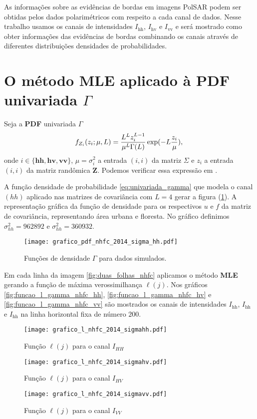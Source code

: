 As informações sobre as evidências de bordas em imagens PolSAR podem ser obtidas pelos dados polarimétricos com respeito a cada canal de dados. Nesse trabalho usamos os canais de intensidades $I_{\text{hh}}$, $I_{\text{hv}}$ e $I_{\text{vv}}$ e será mostrado como obter informações das evidências de bordas combinando os canais através de diferentes distribuições densidades de probabilidades.   


\section{O método \textbf{MLE} aplicado à \textbf{PDF} univariada $\Gamma$}

Seja a \textbf{PDF} univariada $\Gamma$  
\begin{equation}\label{eq:univariada_gamma}
	f_{Z_{i}}(z_{i};\mu,L)=\frac{L^{L}z_{i}^{L-1}}{\mu^L\Gamma(L)} \exp(-L\frac{z_i}{\mu}), \\
\end{equation}
onde $i\in \{\textbf{hh}, \textbf{hv}, \textbf{vv}\}$, $\mu=\sigma_{i}^2$ a entrada $(i,i)$ da matriz $\Sigma$ e $z_{i}$ a entrada $(i,i)$ da matriz randômica $\mathbf{Z}$. Podemos verificar essa expressão em \citep{fnc, nhfc, hsbmp}.	 

A função densidade de probabilidade \eqref{eq:univariada_gamma} que modela o canal $(hh)$ aplicado nas matrizes de covariância com $L=4$ gerar a figura (\ref{fig:densidades_para_u_f_nhfc}). A representação gráfica da função de densidade para os respectivos $u$ e $f$ da matriz de covariância, representando área urbana e floresta. No gráfico definimos $\sigma^2_{hh}=962892$ e $\sigma^2_{hh}= 360932$. 

\begin{figure}[hbt]
	\centering
  \texttt{[image: grafico\_pdf\_nhfc\_2014\_sigma\_hh.pdf]}
	\caption{Funções de densidade $\Gamma$ para dados simulados.}\label{fig:densidades_para_u_f_nhfc}
\end{figure}

	Em cada linha da imagem \eqref{fig:duas_folhas_nhfc} aplicamos o método \textbf{MLE} gerando a função de máxima verossimilhança $\ell(j)$. Nos gráficos \eqref{fig:funcao_l_gamma_nhfc_hh}, \eqref{fig:funcao_l_gamma_nhfc_hv} e \eqref{fig:funcao_l_gamma_nhfc_vv} são mostrados os canais de intensidades $I_{\text{hh}}$, $I_{\text{hh}}$ e $I_{\text{hh}}$ na linha horizontal fixa de número $200$. 
\begin{figure}[hbt]\label{fig:funcao_l_gamma_nhfc}
  \texttt{[image: grafico\_l\_nhfc\_2014\_sigmahh.pdf]}
	\caption{Função $\ell(j)$ para o canal $I_{HH}$}\label{fig:funcao_l_gamma_nhfc_hh}
\endminipage\hfill
{}
  \texttt{[image: grafico\_l\_nhfc\_2014\_sigmahv.pdf]}
	\caption{Função $\ell(j)$ para o canal $I_{HV}$}\label{fig:funcao_l_gamma_nhfc_hv}
\endminipage\hfill
\centering
{}
  \texttt{[image: grafico\_l\_nhfc\_2014\_sigmavv.pdf]}
	\caption{Função $\ell(j)$ para o canal $I_{VV}$}\label{fig:funcao_l_gamma_nhfc_vv}
\endminipage\hfill
\end{figure}

